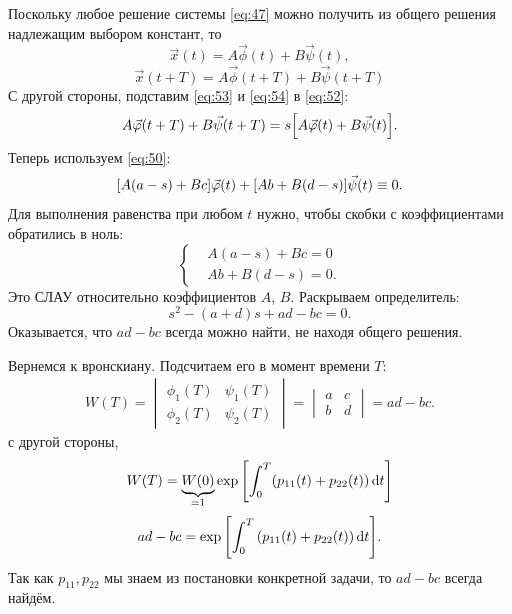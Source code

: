 Поскольку любое решение системы \eqref{eq:47} можно получить из общего решения надлежащим выбором констант, то
\begin{equation}
	\vec{x}(t)=A\vec{\phi}(t)+B\vec{\psi}(t),
	\label{eq:53}	
\end{equation}
% 
\begin{equation}
	\vec{x}(t+T)=A\vec{\phi}(t+T)+B\vec{\psi}(t+T)
	\label{eq:54}	
\end{equation}
С другой стороны, подставим \eqref{eq:53} и \eqref{eq:54} в \eqref{eq:52}:
\begin{equation}
	A\vec{\varphi}(t+T)+B\vec{\psi}(t+T)=s\qty[A\vec{\varphi}(t)+B\vec{\psi}(t)].
	\label{eq:55}	
\end{equation}
Теперь используем \eqref{eq:50}:
\begin{equation}
	\qty[A(a-s)+Bc]\vec{\varphi}(t)+\qty[Ab+B(d-s)]\vec{\psi}(t) \equiv 0.
	\label{eq:56}	
\end{equation}
Для выполнения равенства при любом $t$ нужно, чтобы скобки с коэффициентами обратились в ноль:
\begin{equation}
	\left\{\begin{aligned}
		&A(a-s)+Bc=0 \\
		&Ab+B(d-s)=0.		
	\end{aligned}\right.
	\label{eq:57}
\end{equation}
Это СЛАУ относительно коэффициентов $A$, $B$. Раскрываем определитель:
\begin{equation}
	s^2-(a+d)s+ad-bc=0.
	\label{eq:58}	
\end{equation}
Оказывается, что $ad-bc$ всегда можно найти, не находя общего решения.

Вернемся к вронскиану. Подсчитаем его в момент времени $T$:
\begin{gather*}
	W(T)= 
	\begin{vmatrix}
		\phi_1(T) & \psi_1(T) \\ 
		\phi_2(T) & \psi_2(T)
	\end{vmatrix}
	=
	\begin{vmatrix}
		a & c \\ 
		b & d
	\end{vmatrix}
	=ad-bc.
\end{gather*}
с другой стороны,
\begin{eqnarray*}
	W(T)=\underbrace{W(0)}_{\text{=1}}\exp\qty[\int_0^T(p_{11}(t)+p_{22}(t))\dd{t}] \\
\end{eqnarray*}
\begin{equation}
	ad-bc=\exp\qty[\int_0^T\qty(p_{11}(t)+p_{22}(t))\dd{t}].
	\label{eq:59}
\end{equation}
Так как $p_{11}, p_{22}$ мы знаем из постановки конкретной задачи, то $ad-bc$ всегда найдём.

